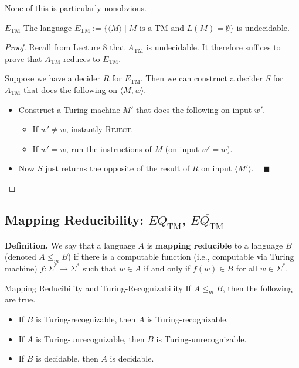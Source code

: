 None of this is particularly nonobvious.

\begin{theorem}{$E_{\mathrm{TM}}$}
    The language $E_{\mathrm{TM}} := \{ \langle M \rangle \mid
    M \text{ is a TM and }  L(M) = \emptyset \}$
    is undecidable.
\end{theorem}

\begin{proof}
    Recall from \href{/18.404/lectures/8/#a-tm-undecidability}{Lecture 8}
    that $A_{\mathrm{TM}}$ is undecidable.
    It therefore suffices to prove that
    $A_{\mathrm{TM}}$ reduces to $E_{\mathrm{TM}}$.

    Suppose we have a decider $R$ for $E_{\mathrm{TM}}$.
    Then we can construct a decider $S$ for $A_{\mathrm{TM}}$
    that does the following on $\langle M, w \rangle$.
    \begin{itemize}
        \item Construct a Turing machine $M'$ that
        does the following on input $w'$.
        \begin{itemize}
            \item If $w' \neq w$, instantly \textsc{Reject}.
            \item If $w' = w$, run the instructions of $M$
            (on input $w' = w$).
        \end{itemize}
        \item Now $S$ just returns the opposite of the result of $R$
        on input $\langle M' \rangle$.
        ~ $\blacksquare$
    \end{itemize}
\end{proof}

\subsection{Mapping Reducibility:
$EQ_{\mathrm{TM}}$, $\overline{EQ_{\mathrm{TM}}}$}

\textbf{Definition.}
We say that a language $A$ is \textbf{mapping reducible} to a language $B$
(denoted $A \leq_m B$) if there is a computable function
(i.e., computable via Turing machine)
$f \colon \Sigma^* \to \Sigma^*$ such that
$w \in A$ if and only if $f(w) \in B$ for all $w \in \Sigma^*$.

\begin{theorem}{Mapping Reducibility and Turing-Recognizability}
    If $A \leq_m B$, then the following are true.
    \begin{itemize}
        \item If $B$ is Turing-recognizable,
        then $A$ is Turing-recognizable.
        \item If $A$ is Turing-unrecognizable,
        then $B$ is Turing-unrecognizable.
        \item If $B$ is decidable, then $A$ is decidable.
    \end{itemize}
\end{theorem}

